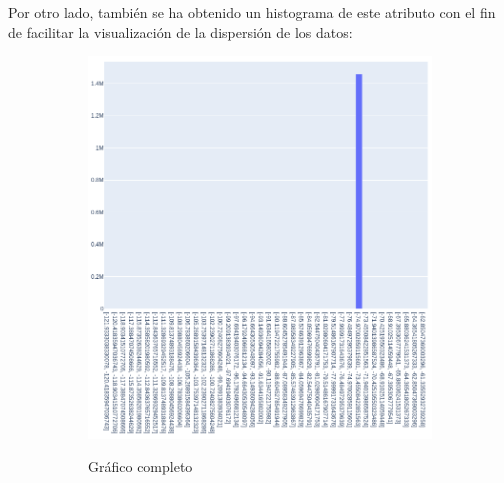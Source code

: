 \documentclass[12pt]{article}
\begin{document}
\begin{itemize}
Por otro lado, también se ha obtenido un histograma de este atributo con el fin de facilitar la visualización de la dispersión de los datos:

\begin{figure}[H]
    \centering
    \begin{subfigure}{0.5\textwidth}
        \centering
        \includegraphics[width=1\textwidth]{dropoff_longitude.PNG}
        \label{fig:sub_dropoff_longitude}
        \caption{Gráfico completo}
    \end{subfigure}%
    \begin{subfigure}{0.5\textwidth}
        \centering

\end{subfigure}
\end{figure}
\end{itemize}
\end{document}
